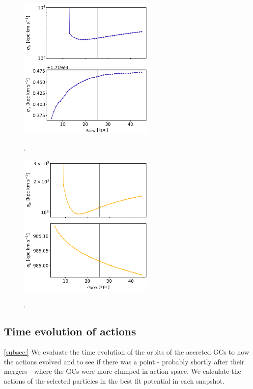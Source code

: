 \begin{figure}[b]
    \centering
	\includegraphics[width=0.6\textwidth]{plots/Dynamics/prog3/a_NFW_diagnostic_plot_std_prog3_all.png}
    \label{fig:NFW_diag_prog3}
\caption{.}
\end{figure}
\begin{figure}[b]
    \centering
	\includegraphics[width=0.6\textwidth]{plots/Dynamics/prog4/a_NFW_diagnostic_plot_std_prog4_all.png}
    \label{fig:NFW_diag_prog4}
\caption{.}
\end{figure}

\subsection{Time evolution of actions}\ref{subsec:}
We evaluate the time evolution of the orbits of the accreted \acp{GC} to how the actions evolved and to see if there was a point - probably shortly after their mergers - where the \acp{GC} were more clumped in action space. We calculate the actions of the selected particles in the best fit potential in each snapshot.  

